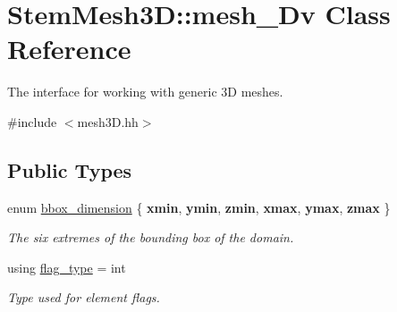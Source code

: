 \hypertarget{classStemMesh3D_1_1mesh__3Dv}{}\section{Stem\+Mesh3D\+:\+:mesh\+\_\+Dv Class Reference}
\label{classStemMesh3D_1_1mesh__3Dv}


The interface for working with generic 3D meshes.  




{\ttfamily \#include $<$mesh3\+D.\+hh$>$}

\subsection*{Public Types}
\begin{DoxyCompactItemize}
\item 
\mbox{\label{classStemMesh3D_1_1mesh__3Dv_a550002922df52cb0711f6d0da2398d6b}} 
enum \hyperlink{classStemMesh3D_1_1mesh__3Dv_a550002922df52cb0711f6d0da2398d6b}{bbox\+\_\+dimension} \{ \newline
{\bfseries xmin}, 
{\bfseries ymin}, 
{\bfseries zmin}, 
{\bfseries xmax}, 
\newline
{\bfseries ymax}, 
{\bfseries zmax}
 \}\begin{DoxyCompactList}\small\item\em The six extremes of the bounding box of the domain. \end{DoxyCompactList}
\item 
\mbox{\label{classStemMesh3D_1_1mesh__3Dv_a9544cba555b60f17f04fcd1689314338}} 
using \hyperlink{classStemMesh3D_1_1mesh__3Dv_a9544cba555b60f17f04fcd1689314338}{flag\+\_\+type} = int
\begin{DoxyCompactList}\small\item\em Type used for element flags. \end{DoxyCompactList}\end{DoxyCompactItemize}
